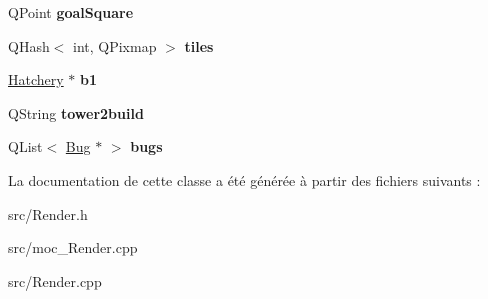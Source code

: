 \begin{DoxyCompactItemize}
\item 
\hypertarget{classRender_a08247005a2c595988f8a0ab14a8b1ad9}{
QPoint {\bfseries goalSquare}}
\label{classRender_a08247005a2c595988f8a0ab14a8b1ad9}

\item 
\hypertarget{classRender_aaa10cde2c7a766914312f85d7c7eb25c}{
QHash$<$ int, QPixmap $>$ {\bfseries tiles}}
\label{classRender_aaa10cde2c7a766914312f85d7c7eb25c}

\item 
\hypertarget{classRender_ac6b86ad92172fefa5b9a56b31e9055d3}{
\hyperlink{classHatchery}{Hatchery} $\ast$ {\bfseries b1}}
\label{classRender_ac6b86ad92172fefa5b9a56b31e9055d3}

\item 
\hypertarget{classRender_ae8f2c323913fe8b89e0e7f443ef41ae0}{
QString {\bfseries tower2build}}
\label{classRender_ae8f2c323913fe8b89e0e7f443ef41ae0}

\item 
\hypertarget{classRender_a3d5b29479d129b61c6ad8f3eec2f1f76}{
QList$<$ \hyperlink{classBug}{Bug} $\ast$ $>$ {\bfseries bugs}}
\label{classRender_a3d5b29479d129b61c6ad8f3eec2f1f76}

\end{DoxyCompactItemize}


La documentation de cette classe a été générée à partir des fichiers suivants :\begin{DoxyCompactItemize}
\item 
src/Render.h\item 
src/moc\_\-Render.cpp\item 
src/Render.cpp\end{DoxyCompactItemize}
